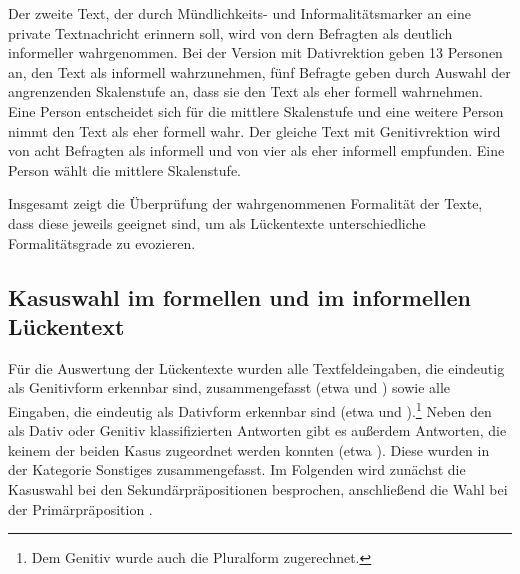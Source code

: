 Der zweite Text, der durch Mündlichkeits- und Informalitätsmarker an eine private Textnachricht erinnern soll, wird von dern Befragten als deutlich informeller wahrgenommen. 
Bei der Version mit Dativrektion geben 13 Personen an, den Text als informell wahrzunehmen, fünf Befragte geben durch Auswahl der angrenzenden Skalenstufe an, dass sie den Text als eher formell wahrnehmen. 
Eine Person entscheidet sich für die mittlere Skalenstufe und eine weitere Person nimmt den Text als eher formell wahr. 
Der gleiche Text mit Genitivrektion wird von acht Befragten als informell und von vier als eher informell empfunden.
Eine Person wählt die mittlere Skalenstufe. 

Insgesamt zeigt die Überprüfung der wahrgenommenen Formalität der Texte, dass diese jeweils geeignet sind, um als Lückentexte unterschiedliche Formalitätsgrade zu evozieren. 
 

\subsection{Kasuswahl im formellen und im informellen Lückentext}
\label{sec:ErgProdInfForm}
Für die Auswertung der Lückentexte wurden alle Textfeldeingaben, die eindeutig als Genitivform erkennbar sind, zusammengefasst (etwa  und ) sowie alle Eingaben, die eindeutig als Dativform erkennbar sind (etwa  und ).\footnote{Dem Genitiv wurde auch die Pluralform  zugerechnet.} 
Neben den als Dativ oder Genitiv klassifizierten Antworten gibt es außerdem Antworten, die keinem der beiden Kasus zugeordnet werden konnten (etwa ). 
Diese wurden in der Kategorie \glqq Sonstiges\grqq{} zusammengefasst. 
Im Folgenden wird zunächst die Kasuswahl bei den Sekundärpräpositionen besprochen, anschließend die Wahl bei der Primärpräposition .

